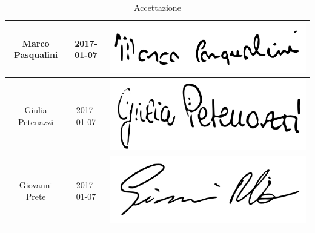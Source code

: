 \begin{table}[H]
\begin{center}
\begin{tabular}{ccc}
			\midrule
			Marco Pasqualini	&	2017-01-07	& \includegraphics[scale=0.09]{./img/Firme/marco.png} \\
			\midrule
			Giulia Petenazzi	&	2017-01-07	& \includegraphics[scale=0.09]{./img/Firme/giulia.png} \\
			\midrule
			Giovanni Prete	&	2017-01-07	& \includegraphics[scale=0.09]{./img/Firme/giovannip.png} \\
			\bottomrule
		\end{tabular}
	\end{center}
	\caption{Accettazione}
\end{table}

